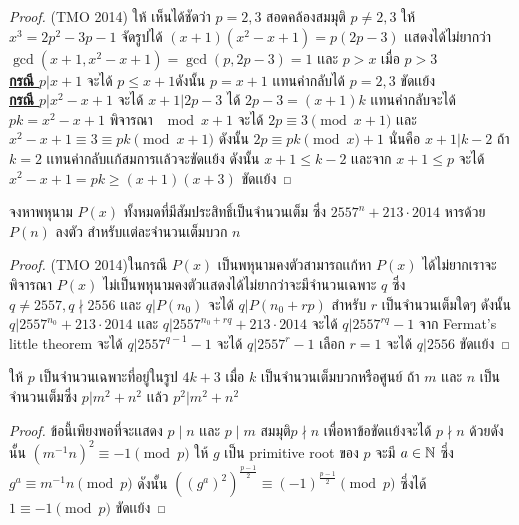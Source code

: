 \documentclass[a4paper,12pt]{scrartcl}
\begin{document}
\begin{proof}
	(TMO 2014) ให้ เห็นได้ชัดว่า $p=2,3$ สอดคล้องสมมุติ $p \neq 2,3$ ให้ $ x^3 = 2p^2-3p-1$ จัดรูปได้ $(x+1)(x^2-x+1)=p(2p-3)$ เเสดงได้ไม่ยากว่า $\gcd(x+1,x^2-x+1)= \gcd(p,2p-3) =1 $ เเละ $p>x$ เมื่อ $ p>3$ \\
	\underline{\textbf{กรณี $p|x+1$}} จะได้ $p\le x+1 $ดังนั้น $p=x+1$ เเทนค่ากลับได้ $p=2,3$ ขัดเเย้ง \\
	\underline{\textbf{กรณี $p|x^2-x+1$}} จะได้ $x+1 | 2p-3$ ได้ $2p-3 = (x+1)k$ เเทนค่ากลับจะได้ $pk =x^2-x+1$ พิจารณา $\mod x+1$ จะได้ $2p \equiv 3 \pmod {x+1}$ เเละ $ x^2-x+1 \equiv 3 \equiv pk \pmod {x+1}$ ดังนั้น $2p \equiv pk \pmod x+1$ นั่นคือ $x+1 | k-2$ ถ้า $k=2$ เเทนค่ากลับเเก้สมการเเล้วจะขัดเเย้ง ดังนั้น $x+1 \le k-2$ เเละจาก $x+1 \le p$ จะได้  $x^2-x+1=pk\ge(x+1)(x+3)$ ขัดเเย้ง
\end{proof}
	\begin{example}
		จงหาพหุนาม $P(x)$ ทั้งหมดที่มีสัมประสิทธิ์เป็นจำนวนเต็ม ซึ่ง $2557^n+213\cdot2014$ หารด้วย $P(n)$ ลงตัว สำหรับเเต่ละจำนวนเต็มบวก $n$
	\end{example}
\begin{proof}
	(TMO 2014)ในกรณี $P(x)$ เป็นพหุนามคงตัวสามารถเเก้หา $P(x)$ ได้ไม่ยากเราจะพิจารณา $P(x)$ ไม่เป็นพหุนามคงตัวเเสดงได้ไม่ยากว่าจะมีจำนวนเฉพาะ $ q$ ซึ่ง $q\neq2557, q\nmid 2556$ เเละ $q|P(n_0)$ จะได้ $q|P(n_0+rp)$ สำหรับ $r$ เป็นจำนวนเต็มใดๆ ดังนั้น $q|2557^{n_0}+213\cdot2014$ เเละ $q|2557^{n_0+rq}+213\cdot2014$  จะได้ $q|2557^{rq}-1$ จาก Fermat's little theorem จะได้ $q|2557^{q-1}-1$ จะได้ $q|2557^{r}-1$ เลือก $r=1$ จะได้ $q|2556$ ขัดเเย้ง
\end{proof}
	\begin{example}
		ให้ $p$ เป็นจำนวนเฉพาะที่อยู่ในรูป $4k+3$ เมื่อ $k$ เป็นจำนวนเต็มบวกหรือศูนย์ ถ้า $m$ เเละ $n$ เป็นจำนวนเต็มซึ่ง $p|m^2+n^2$ เเล้ว $p^2|m^2+n^2$
	\end{example}
\begin{proof}
	ข้อนี้เพียงพอที่จะเเสดง $p\mid n$ เเละ $p \mid m$ สมมุติ$p\nmid n$ เพื่อหาข้อขัดเเย้งจะได้ $p\nmid n$ ด้วยดังนั้น $(m^{-1}n)^2 \equiv -1 \pmod p$ ให้ $g$ เป็น primitive root ของ $p$ จะมี $a \in \mathbb N$ ซึ่ง $g^a \equiv m^{-1}n \pmod p$ ดังนั้น $((g^a)^2)^{\frac{p-1}{2}} \equiv (-1)^{\frac{p-1}{2}} \pmod p$ ซึ่งได้ $1 \equiv -1 \pmod{p} $ ขัดเเย้ง
\end{proof}
\end{document}
